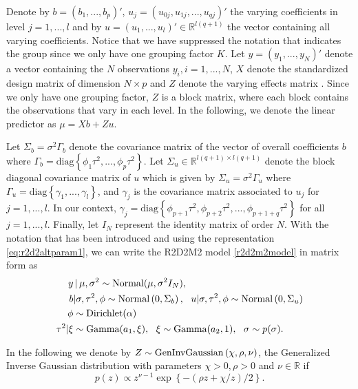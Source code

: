 	Denote by $b=(b_1,...,b_p)'$, $u_j=(u_{0j},u_{1j},...,u_{qj} )'$ the varying coefficients in level $j=1,...,l$ and by $u=(u_1,...,u_l)' \in \mathbb{R}^{l(q+1)}$ the vector containing all varying coefficients. Notice that we have suppressed the notation that indicates the group since we only have one grouping factor $K$. Let $y=(y_1,...,y_N)'$ denote a vector containing the $N$ observations $y_i, i=1,...,N$, $X$ denote the standardized design matrix of dimension $N \times p$ and $Z$ denote the varying effects matrix   \citep[see][for details on how to construct $Z$]{lme4}. Since we only have one grouping factor, $Z$ is a block matrix, where each block contains the observations that vary in each level. In the following, we denote the linear predictor as $\mu= Xb + Zu$.

    Let $\Sigma_b=\sigma^2 \Gamma_b$ denote the covariance matrix of the vector of overall coefficients $b$ where $\Gamma_b=\text{diag}\left\lbrace \phi_1  \tau^2 ,..., \phi_p  \tau^2    \right\rbrace$. Let  $\Sigma_u \in \mathbb{R}^{l (q+1)\times l (q+1)}$ denote the block diagonal covariance matrix of $u$ which is given by  $\Sigma_u= \sigma^2 \Gamma_u $ where $\Gamma_u= \text{diag} \left \lbrace \gamma_{1},..., \gamma_{l} \right \rbrace$, and $\gamma_j$ is the covariance matrix associated to $u_j$ for $j=1,...,l$. In our context, $\gamma_j= \text{diag} \left\lbrace \phi_{p+1}\tau^2, \phi_{p+2} \tau^2, ..., \phi_{p+1+q} \tau^2  \right\rbrace $ for all $j=1,...,l$. Finally,  let $I_N$ represent the identity matrix of order $N$.  With the notation that has been introduced and using the representation \eqref{eq:r2d2altparam1}, we can write the R2D2M2 model \eqref{r2d2m2model} in matrix form as
    \begin{equation}
    \label{eq:r2d2altparam2}
    \begin{aligned}
		y &\,|\, \mu, \sigma^2 \sim \text{Normal}(\mu, \sigma^2 I_N), \\
		b&|\sigma, \tau^2, \phi \sim \text{Normal} \left(0, \Sigma_b \right), \ \
		u|\sigma, \tau^2, \phi \sim \text{Normal} \left(0,  \Sigma_u \right) \\
		\phi & \sim \text{Dirichlet}(\alpha) \\
	    \tau^2 | \xi &\sim \text{Gamma} (a_1, \xi), \ \
		\xi \sim \text{Gamma}(a_2, 1), \ \  \sigma \sim p(\sigma).
	\end{aligned}
    \end{equation}

In the following we denote by $Z \sim \text{GenInvGaussian} \left(  \chi, \rho, \nu  \right) $, the Generalized Inverse Gaussian distribution  \citep{RobertGIG} with parameters $\chi>0, \rho>0$ and $\nu \in \mathbb{R}$  if
	\[ p(z) \propto  z^{\nu-1} \exp\left\lbrace   -\left(  \rho z+ \chi/z  \right)/2    \right\rbrace. \]

